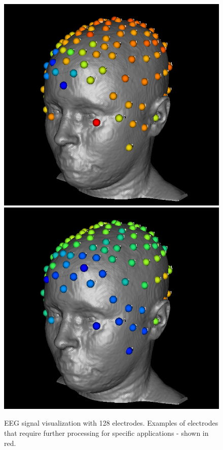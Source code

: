 \begin{figure}[H]
\begin{center}
\includegraphics[width=.49\textwidth]{Figures/128_eeg_1}
\includegraphics[width=.49\textwidth]{Figures/128_eeg_2}
\caption{EEG signal visualization with 128 electrodes. Examples of electrodes that require further processing for specific applications - shown in red.}
\label{fig:eegvis}
\end{center}
\end{figure}